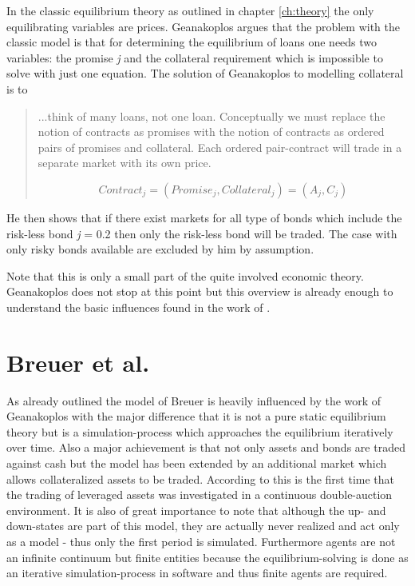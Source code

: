 \documentclass[../Bachelorarbeit.tex]{subfiles}
\begin{document}
\medskip

In the classic equilibrium theory as outlined in chapter \ref{ch:theory} the only equilibrating variables are prices. Geanakoplos argues that the problem with the classic model is that for determining the equilibrium of loans one needs two variables: the promise \textit{j} and the collateral requirement which is impossible to solve with just one equation.
The solution of Geanakoplos to modelling collateral is to

\begin{quote}
...think of many loans, not one loan. Conceptually we must replace the notion of contracts as promises with the notion of contracts as ordered pairs of promises and collateral. Each ordered pair-contract will trade in a separate market with its own price.

\begin{equation}
Contract_j = (Promise_j, Collateral_j) = (A_j, C_j)
\end{equation}
\end{quote}

He then shows that if there exist markets for all type of bonds which include the risk-less bond \textit{j} = 0.2 then only the risk-less bond will be traded. The case with only risky bonds available are excluded by him by assumption.

\medskip

Note that this is only a small part of the quite involved economic theory. Geanakoplos does not stop at this point but this overview is already enough to understand the basic influences found in the work of \cite{Breuer2015}.

\section{Breuer et al.}
As already outlined the model of Breuer is heavily influenced by the work of Geanakoplos with the major difference that it is not a pure static equilibrium theory but is a simulation-process which approaches the equilibrium iteratively over time. Also a major achievement is that not only assets and bonds are traded against cash but the model has been extended by an additional market which allows collateralized assets to be traded. According to \cite{Breuer2015} this is the first time that the trading of leveraged assets was investigated in a continuous double-auction environment. It is also of great importance to note that although the up- and down-states are part of this model, they are actually never realized and act only as a model - thus only the first period is simulated. Furthermore agents are not an infinite continuum but finite entities because the equilibrium-solving is done as an iterative simulation-process in software and thus finite agents are required.
\end{document}
